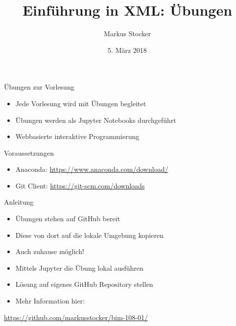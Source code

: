 \documentclass{beamer}
\title{Einführung in XML: Übungen}
\author{Markus Stocker}
\date{5. März 2018}
\begin{document}
\maketitle

\begin{frame}{Übungen zur Vorlesung}
  
  \begin{itemize}
  	\item Jede Vorlesung wird mit Übungen begleitet
  	\item Übungen werden als Jupyter Notebooks durchgeführt
  	\item Webbasierte interaktive Programmierung
  \end{itemize}
  
\end{frame}

\begin{frame}{Voraussetzungen}
	
	\begin{itemize}
		\item Anaconda: \url{https://www.anaconda.com/download/}
		\item Git Client: \url{https://git-scm.com/downloads}
	\end{itemize}
	
\end{frame}

\begin{frame}[fragile]{Anleitung}
	
	\begin{itemize}
		\item Übungen stehen auf GitHub bereit
		\item Diese von dort auf die lokale Umgebung kopieren
		\item Auch zuhause möglich!
		\item Mittels Jupyter die Übung lokal ausführen
		\item Lösung auf eigenes GitHub Repository stellen
		\item Mehr Information hier:
	\end{itemize}
	
	\vspace{0.5cm}
	\Large\centering
  \url{https://github.com/markusstocker/bim-108-01/}
	
\end{frame}
\end{document}
